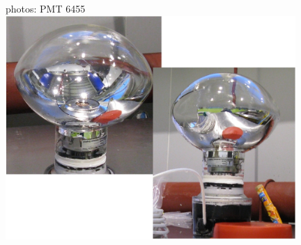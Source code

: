 \documentclass{beamer}
\begin{document}
\begin{frame}{photos: PMT 6455}
	\includegraphics[width=11cm]{PMT6455.jpg}
\end{frame}
\end{document}
